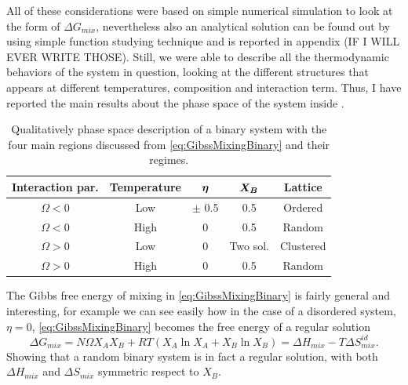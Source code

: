 All of these considerations were based on simple numerical simulation to look at the form of $\Delta G_{mix}$, nevertheless also an analytical solution can be found out by using simple function studying technique and is reported in appendix (IF I WILL EVER WRITE THOSE). Still, we were able to describe all the thermodynamic behaviors of the system in question, looking at the different structures that appears at different temperatures, composition and interaction term. Thus, I have reported the main results about the phase space of the system inside .

\begin{table}[t]
    \centering
    \caption
    {
        Qualitatively phase space description of a binary system with the four main regions discussed from \eqref{eq:GibssMixingBinary} and their regimes.
    }
    \label{tab:phaseBinary}
    \begin{tabular}{ccccc}
        \toprule
        \toprule
        \textbf{Interaction par.} & \textbf{Temperature} & $\vb*{\eta}$ & $\vb*{X_B}$ & \textbf{Lattice}\\
        \midrule
        $\Omega < 0$ & Low & $\pm$ 0.5 & 0.5 & Ordered\\
        $\Omega < 0$ & High & 0 & 0.5 & Random\\
        $\Omega > 0$ & Low & 0 & Two sol. & Clustered\\
        $\Omega > 0$ & High & 0 & 0.5 & Random\\
        \bottomrule
        \bottomrule
    \end{tabular}
\end{table}


\nt
{
    The Gibbs free energy of mixing in \eqref{eq:GibssMixingBinary} is fairly general and interesting, for example we can see easily how in the case of a disordered system, $\eta = 0$, \eqref{eq:GibssMixingBinary} becomes the free energy of a regular solution
    \begin{equation}
        \Delta G_{mix} = N\Omega X_AX_B + RT\left( X_A \ln X_A + X_B\ln X_B \right) = \Delta H_{mix} - T\Delta S_{mix}^{id}.
    \end{equation}
    Showing that a random binary system is in fact a regular solution, with both $\Delta H_{mix}$ and $\Delta S_{mix}$ symmetric respect to $X_B$.
}